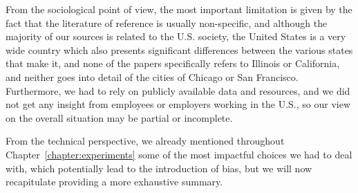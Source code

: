 From the sociological point of view, the most important limitation is given by the fact that the literature of reference is usually non-specific, and although the majority of our sources is related to the U.S. society, the United States is a very wide country which also presents significant differences between the various states that make it, and none of the papers specifically refers to Illinois or California, and neither goes into detail of the cities of Chicago or San Francisco. Furthermore, we had to rely on publicly available data and resources, and we did not get any insight from employees or employers working in the U.S., so our view on the overall situation may be partial or incomplete.

From the technical perspective, we already mentioned throughout Chapter~\ref{chapter:experiments} some of the most impactful choices we had to deal with, which potentially lead to the introduction of bias, but we will now recapitulate providing a more exhaustive summary.
